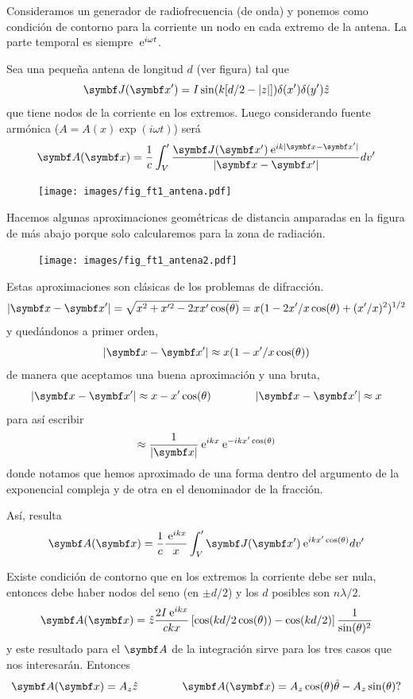\documentclass[10pt,oneside]{CBFT_book}
\begin{document}
Consideramos un generador de radiofrecuencia (de onda) y ponemos como condición de contorno
para la corriente un nodo en cada extremo de la antena.
La parte temporal es siempre $\:\mathrm{e}^{i \omega t}$.

Sea una pequeña antena de longitud $d$ (ver figura) tal que 
\[
	\vb{J}(\vb{x}') = I \sin( k[d/2 - |z|] ) \delta(x') \delta(y')  \hat{z}
\]
que tiene nodos de la corriente en los extremos. Luego considerando fuente armónica ($A=A(x)\exp(i\omega t)$)
será
\[
	\vb{A}(\vb{x}) = \frac{1}{c} \int_V' \frac{ \vb{J}(\vb{x}') \euler^{ i k |\vb{x}-\vb{x}'| }}
	{ |\vb{x}-\vb{x}'| } dv'
\]

\begin{figure}[htb]
	\begin{center}
	\texttt{[image: images/fig\_ft1\_antena.pdf]}	 
	\end{center}
	\caption{}
\end{figure} 

Hacemos algunas aproximaciones geométricas de distancia amparadas en la figura de más abajo porque
solo calcularemos para la zona de radiación.
	
\begin{figure}[htb]
	\begin{center}
	\texttt{[image: images/fig\_ft1\_antena2.pdf]}	 
	\end{center}
	\caption{}
\end{figure} 

Estas aproximaciones son clásicas de los problemas de difracción.
\[
	|\vb{x}-\vb{x}'| = \sqrt{ x^2 + x'^2 - 2xx'\cos(\theta)} =  
	x( 1 - 2x'/x \cos(\theta) + (x'/x)^2)^{1/2} 
\]
y quedándonos a primer orden,
\[
	|\vb{x}-\vb{x}'|\approx x (1 - x'/x \cos(\theta))
\]
de manera que aceptamos una buena aproximación y una bruta,
\[
	|\vb{x}-\vb{x}'| \approx x - x' \cos( \theta ) \qquad \qquad |\vb{x}-\vb{x}'| \approx x
\]
para así escribir
\[
	\approx \frac{1}{|\vb{x}|} \euler^{ikx} \euler^{-ikx'\cos(\theta)}
\]
donde notamos que hemos aproximado de una forma dentro del argumento de la exponencial compleja
y de otra en el denominador de la fracción.

Así, resulta
\[
	\vb{A}(\vb{x}) = \frac{1}{c} \frac{\euler^{ i k x} }{x} \int_V' \vb{J}(\vb{x}') 
		\euler^{ i k x' \cos(\theta) } dv'
\]

Existe condición de contorno que en los extremos la corriente debe ser nula, entonces debe haber nodos
del seno (en $\pm d/2$) y los $d$ posibles son $ n\lambda/2$.
\[
	\vb{A}(\vb{x}) = \hat{z} \frac{2I\euler^{ikx}}{ckx}\left[ \cos( kd/2 \cos(\theta) )- 
		\cos( kd/2 ) \right]\frac{1}{\sin(\theta)^2}
\]
y este resultado para el $\vb A$ de la integración sirve para los tres casos que nos interesarán.
Entonces 
\[
	\vb{A}(\vb{x}) = A_z \hat{z} \qquad \qquad \vb{A}(\vb{x}) =  A_z\cos(\theta)\hat{\theta} - 
		A_z\sin(\theta) ?
\]
\end{document}

